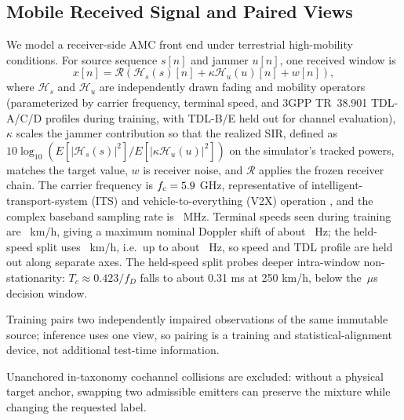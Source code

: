 \documentclass[letterpaper,journal]{IEEEtran}
\begin{document}
\subsection{Mobile Received Signal and Paired Views}
We model a receiver-side AMC front end under terrestrial high-mobility
conditions. For source sequence $s[n]$ and jammer $u[n]$, one received window is
\begin{equation}
x[n]=\mathcal{R}\!\left(\mathcal{H}_s(s)[n]
+\kappa\mathcal{H}_u(u)[n]+w[n]\right),
\label{eq:rx}
\end{equation}
where $\mathcal{H}_s$ and $\mathcal{H}_u$ are independently drawn fading and
mobility operators (parameterized by carrier frequency, terminal speed, and
3GPP TR~38.901 \cite{3gpp38901} TDL-A/C/D profiles during training, with
TDL-B/E held out for channel evaluation), $\kappa$ scales the jammer
contribution so that the realized SIR, defined as
$10\log_{10}\!\left(E[|\mathcal{H}_s(s)|^2]/E[|\kappa\mathcal{H}_u(u)|^2]\right)$
on the simulator's tracked powers, matches the target value, $w$ is
receiver noise, and $\mathcal{R}$ applies the frozen receiver chain. The
carrier frequency is $f_c=5.9$ GHz, representative of
intelligent-transport-system (ITS) and vehicle-to-everything (V2X) operation
\cite{3gpp37885}, and the complex baseband
sampling rate is \SampleRateMHz\ MHz. Terminal speeds seen during training are
\SeenSpeeds\ km/h, giving a maximum nominal Doppler shift of about
\MaxDopplerSeenHz\ Hz; the held-speed split uses \HeldSpeeds\ km/h, i.e.\ up to
about \MaxDopplerHeldHz\ Hz, so speed and TDL profile are held out along
separate axes. The held-speed split probes deeper intra-window
non-stationarity: $T_c\approx0.423/f_D$ falls to about 0.31 ms at 250 km/h,
below the \WindowMicroseconds\,$\mu$s decision window.

Training pairs two
independently impaired observations of the same immutable source; inference
uses one view, so pairing is a training and statistical-alignment device,
not additional test-time information.

Unanchored in-taxonomy cochannel collisions are excluded: without a physical
target anchor, swapping two admissible emitters can preserve the mixture
while changing the requested label.
\end{document}
